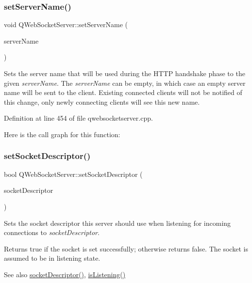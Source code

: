 \subsubsection{\texorpdfstring{set\+Server\+Name()}{setServerName()}}
{\footnotesize\ttfamily void Q\+Web\+Socket\+Server\+::set\+Server\+Name (\begin{DoxyParamCaption}\item[{const Q\+String \&}]{server\+Name }\end{DoxyParamCaption})}

Sets the server name that will be used during the H\+T\+TP handshake phase to the given {\itshape server\+Name}. The {\itshape server\+Name} can be empty, in which case an empty server name will be sent to the client. Existing connected clients will not be notified of this change, only newly connecting clients will see this new name. 

Definition at line 454 of file qwebsocketserver.\+cpp.

Here is the call graph for this function\+:
\mbox{\label{class_q_web_socket_server_a9a4f765799fe4423be47c54c51a16b20}} 
\subsubsection{\texorpdfstring{set\+Socket\+Descriptor()}{setSocketDescriptor()}}
{\footnotesize\ttfamily bool Q\+Web\+Socket\+Server\+::set\+Socket\+Descriptor (\begin{DoxyParamCaption}\item[{int}]{socket\+Descriptor }\end{DoxyParamCaption})}

Sets the socket descriptor this server should use when listening for incoming connections to {\itshape socket\+Descriptor}.

Returns true if the socket is set successfully; otherwise returns false. The socket is assumed to be in listening state.

\begin{DoxySeeAlso}{See also}
\mbox{\hyperlink{class_q_web_socket_server_a3b83cfc7602ecd27ca21a1ec80220dc0}{socket\+Descriptor()}}, \mbox{\hyperlink{class_q_web_socket_server_a4505cb4c119bc490f8bf401998c6df43}{is\+Listening()}} 
\end{DoxySeeAlso}


